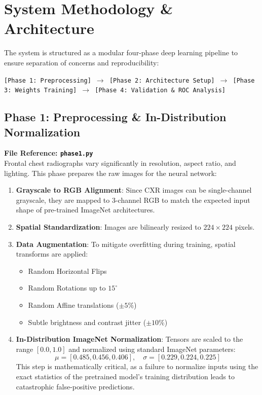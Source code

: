 \documentclass[12pt,oneside]{report}
\begin{document}
\chapter{System Methodology \& Architecture}

The system is structured as a modular four-phase deep learning pipeline to ensure separation of concerns and reproducibility:
\begin{center}
    \texttt{[Phase 1: Preprocessing] $\to$ [Phase 2: Architecture Setup] $\to$ [Phase 3: Weights Training] $\to$ [Phase 4: Validation \& ROC Analysis]}
\end{center}

\section{Phase 1: Preprocessing \& In-Distribution Normalization}
\textbf{File Reference: \texttt{phase1.py}} \\
Frontal chest radiographs vary significantly in resolution, aspect ratio, and lighting. This phase prepares the raw images for the neural network:
\begin{enumerate}
    \item \textbf{Grayscale to RGB Alignment}: Since CXR images can be single-channel grayscale, they are mapped to 3-channel RGB to match the expected input shape of pre-trained ImageNet architectures.
    \item \textbf{Spatial Standardization}: Images are bilinearly resized to $224\times224$ pixels.
    \item \textbf{Data Augmentation}: To mitigate overfitting during training, spatial transforms are applied:
    \begin{itemize}
        \item Random Horizontal Flips
        \item Random Rotations up to $15^\circ$
        \item Random Affine translations ($\pm5\%$)
        \item Subtle brightness and contrast jitter ($\pm10\%$)
    \end{itemize}
    \item \textbf{In-Distribution ImageNet Normalization}: Tensors are scaled to the range $[0.0, 1.0]$ and normalized using standard ImageNet parameters:
    \begin{equation}
    \mu = [0.485, 0.456, 0.406], \quad \sigma = [0.229, 0.224, 0.225]
    \end{equation}
    This step is mathematically critical, as a failure to normalize inputs using the exact statistics of the pretrained model's training distribution leads to catastrophic false-positive predictions.
\end{enumerate}
\end{document}
